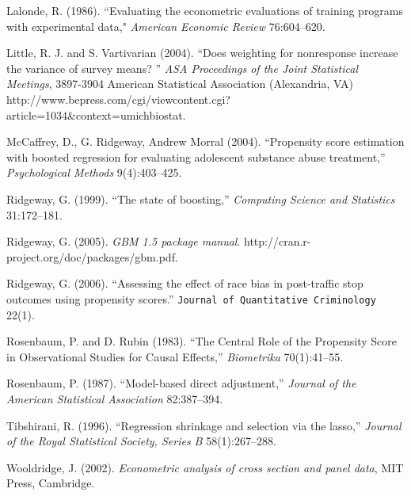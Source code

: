 \documentclass{article}
\begin{document}
\begin{thebibliography}{77}
 Lalonde, R. (1986). ``Evaluating the econometric evaluations of training
programs with experimental data," \textit{American Economic Review}
76:604--620.

Little, R. J. and S. Vartivarian (2004). 
``Does weighting for nonresponse increase the variance of survey means? ''
\textit{ASA Proceedings of the Joint Statistical Meetings}, 3897-3904 
American Statistical Association (Alexandria, VA) 
http://www.bepress.com/cgi/viewcontent.cgi?article=1034\&context=umichbiostat.
 
 McCaffrey, D., G. Ridgeway, Andrew Morral (2004). ``Propensity score estimation
with boosted regression for evaluating adolescent substance abuse treatment,''
\textit{Psychological Methods} 9(4):403--425.

 Ridgeway, G. (1999). ``The state of boosting,'' \textit{Computing Science and
Statistics} 31:172--181.

 Ridgeway, G. (2005). \textit{GBM 1.5 package manual}.
http://cran.r-project.org/doc/packages/gbm.pdf.

 Ridgeway, G. (2006). ``Assessing the effect of race bias in
post-traffic stop outcomes using propensity scores.'' \texttt{Journal of
Quantitative Criminology} 22(1).

Rosenbaum, P. and D. Rubin (1983). ``The Central Role of the Propensity Score
in Observational Studies for Causal Effects,'' \emph{Biometrika} 70(1):41--55.

 Rosenbaum, P. (1987). ``Model-based direct adjustment,'' \textit{Journal of the
American Statistical Association} 82:387--394.

 Tibshirani, R. (1996). ``Regression shrinkage and selection via the lasso,''
\textit{Journal of the Royal Statistical Society, Series B} 58(1):267--288.

 Wooldridge, J. (2002). \textit{Econometric analysis of cross section and panel
data}, MIT Press, Cambridge.

\end{thebibliography}           %
\end{document}
